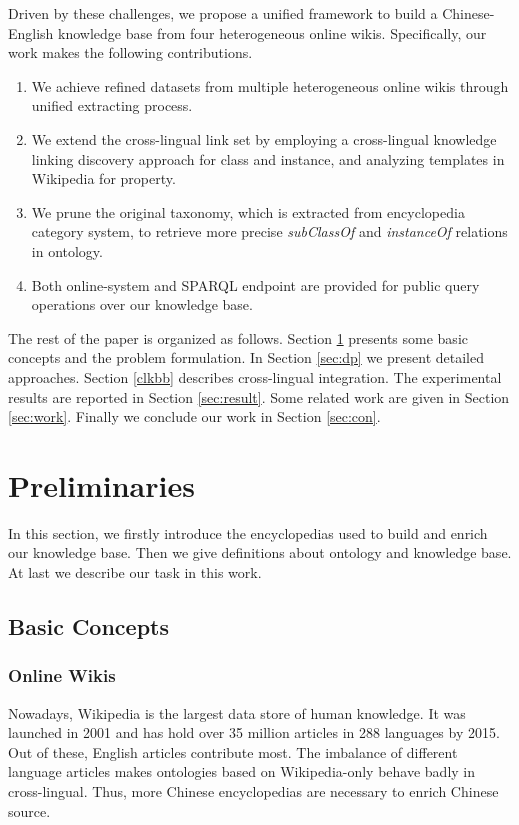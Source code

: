 \documentclass[runningheads,a4paper]{llncs}
\begin{document}
Driven by these challenges, we propose a unified framework to build a Chinese-English knowledge base from four heterogeneous online wikis. Specifically, our work makes the following contributions.
\begin{enumerate}
  \item We achieve refined datasets from multiple heterogeneous online wikis through unified extracting process. 
  \item We extend the cross-lingual link set by employing a cross-lingual knowledge linking discovery approach for class and instance, and analyzing templates in Wikipedia for property.
  \item We prune the original taxonomy, which is extracted from encyclopedia category system, to retrieve more precise \textit{subClassOf} and \textit{instanceOf} relations in ontology.
  \item Both online-system and SPARQL endpoint are provided for public query operations over our knowledge base.
\end{enumerate}

The rest of the paper is organized as follows. Section \ref{sec:pd} presents some basic concepts and the problem formulation. In Section \ref{sec:dp} we present detailed approaches. Section \ref{clkbb} describes cross-lingual integration. The experimental results are reported in Section \ref{sec:result}. Some related work are given in Section \ref{sec:work}. Finally we conclude our work in Section \ref{sec:con}.

\section{Preliminaries}
\label{sec:pd}
In this section, we firstly introduce the encyclopedias used to build and enrich our knowledge base. Then we give definitions about ontology and knowledge base. At last we describe our task in this work.

\subsection{Basic Concepts}
\subsubsection{Online Wikis}
Nowadays, Wikipedia is the largest data store of human knowledge. It was launched in 2001 and has hold over 35 million articles in 288 languages by 2015. Out of these, English articles contribute most. The imbalance of different language articles makes ontologies based on Wikipedia-only behave badly in cross-lingual. Thus, more Chinese encyclopedias are necessary to enrich Chinese source.
\end{document}
